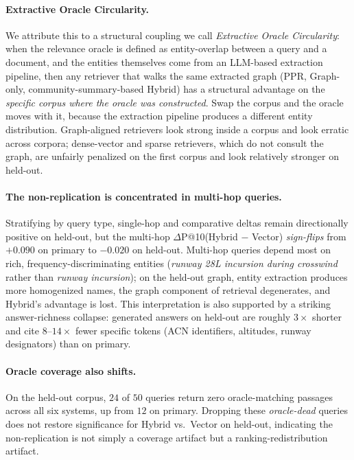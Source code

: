 \documentclass[10pt,a4paper]{article}
\begin{document}
\paragraph{Extractive Oracle Circularity.} We attribute this to a
structural coupling we call \emph{Extractive Oracle Circularity}:
when the relevance oracle is defined as entity-overlap between a
query and a document, and the entities themselves come from an
LLM-based extraction pipeline, then any retriever that walks the
same extracted graph (PPR, Graph-only, community-summary-based
Hybrid) has a structural advantage on the \emph{specific corpus
where the oracle was constructed}. Swap the corpus and the oracle
moves with it, because the extraction pipeline produces a different
entity distribution. Graph-aligned retrievers look strong inside a
corpus and look erratic across corpora; dense-vector and sparse
retrievers, which do not consult the graph, are unfairly penalized
on the first corpus and look relatively stronger on held-out.

\paragraph{The non-replication is concentrated in multi-hop queries.}
Stratifying by query type, single-hop and comparative deltas remain
directionally positive on held-out, but the multi-hop
$\Delta$P@10(Hybrid $-$ Vector) \emph{sign-flips} from
$+0.090$ on primary to $-0.020$ on held-out. Multi-hop queries
depend most on rich, frequency-discriminating entities
(\emph{runway 28L incursion during crosswind} rather than
\emph{runway incursion}); on the held-out graph, entity extraction
produces more homogenized names, the graph component of retrieval
degenerates, and Hybrid's advantage is lost. This interpretation is
also supported by a striking answer-richness collapse: generated
answers on held-out are roughly $3\times$ shorter and cite
$8$--$14\times$ fewer specific tokens (ACN identifiers, altitudes,
runway designators) than on primary.

\paragraph{Oracle coverage also shifts.} On the held-out corpus,
$24$ of $50$ queries return zero oracle-matching passages
across all six systems, up from $12$ on primary. Dropping
these \emph{oracle-dead} queries does not restore significance for
Hybrid vs.\ Vector on held-out, indicating the non-replication is
not simply a coverage artifact but a ranking-redistribution
artifact.
\end{document}
